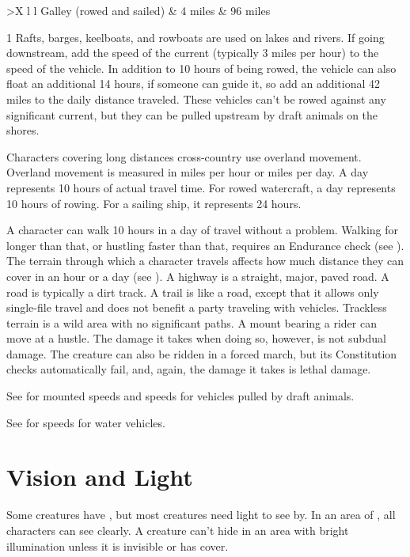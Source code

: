 \begin{dtable}
\begin{dtabularx}{\columnwidth}{>{\lcol}X l l}
                \tind Galley (rowed and sailed) & 4 miles & 96 miles \\
            \end{dtabularx}
            1 Rafts, barges, keelboats, and rowboats are used on lakes and rivers.
            If going downstream, add the speed of the current (typically 3 miles per hour) to the speed of the vehicle. In addition to 10 hours of being rowed, the vehicle can also float an additional 14 hours, if someone can guide it, so add an additional 42 miles to the daily distance traveled. These vehicles can't be rowed against any significant current, but they can be pulled upstream by draft animals on the shores.
        \end{dtable}

        Characters covering long distances cross-country use overland movement. Overland movement is measured in miles per hour or miles per day. A day represents 10 hours of actual travel time. For rowed watercraft, a day represents 10 hours of rowing. For a sailing ship, it represents 24 hours.

         A character can walk 10 hours in a day of travel without a problem. Walking for longer than that, or hustling faster than that, requires an Endurance check (see ).
         The terrain through which a character travels affects how much distance they can cover in an hour or a day (see ).
        A highway is a straight, major, paved road.
        A road is typically a dirt track.
        A trail is like a road, except that it allows only single-file travel and does not benefit a party traveling with vehicles.
        Trackless terrain is a wild area with no significant paths.
         A mount bearing a rider can move at a hustle. The damage it takes when doing so, however, is not subdual damage. The creature can also be ridden in a forced march, but its Constitution checks automatically fail, and, again, the damage it takes is lethal damage.

        See  for mounted speeds and speeds for vehicles pulled by draft animals.

         See  for speeds for water vehicles.

\section{Vision and Light}\label{Vision and Light}
    Some creatures have , but most creatures need light to see by. 
    In an area of , all characters can see clearly.
    A creature can't hide in an area with bright illumination unless it is invisible or has cover.

